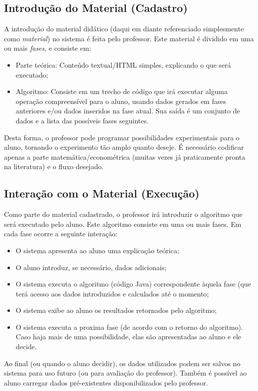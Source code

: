 \documentclass{abnt}
\begin{document}
\subsection{Introdução do Material (Cadastro)}
A introdução do material didático (daqui em diante referenciado simplesmente como \textit{material}) no sistema é feita pelo professor. Este material é dividido em uma ou mais \textit{fases}, e consiste em:
\begin{itemize}
\item Parte teórica: Conteúdo textual/HTML simples, explicando o que será executado; 
\item Algoritmo: Consiste em um trecho de código que irá executar alguma operação compreensível para o aluno, usando dados gerados em fases anteriores e/ou dados inseridos na fase atual. Sua saída é um conjunto de dados e a lista das possíveis fases seguintes. 
\end{itemize}

Desta forma, o professor pode programar possibilidades experimentais para o aluno, tornando o experimento tão amplo quanto deseje. É necessário codificar apenas a parte matemática/econométrica (muitas vezes já praticamente pronta na literatura) e o fluxo desejado.

\subsection{Interação com o Material (Execução)}

Como parte do material cadastrado, o professor irá introduzir o algoritmo que será executado pelo aluno. Este algoritmo consiste em uma ou mais fases. Em cada fase ocorre a seguinte interação:
\begin{itemize}
\item O sistema apresenta ao aluno uma explicação teórica;
\item O aluno introduz, se necessário, dados adicionais;
\item O sistema executa o algoritmo (código Java) correspondente àquela fase (que terá acesso aos dados introduzidos e calculados até o momento;
\item O sistema exibe ao aluno os resultados retornados pelo algoritmo;
\item O sistema executa a proxima fase (de acordo com o retorno do algoritmo). Caso haja mais de uma possibilidade, elas são apresentadas ao aluno e ele decide.
\end{itemize}

Ao final (ou quando o aluno decidir), os dados utilizados podem ser salvos no sistema para uso futuro (ou para avaliação do professor). Também é possível ao aluno carregar dados pré-existentes disponibilizados pelo professor.
\end{document}
